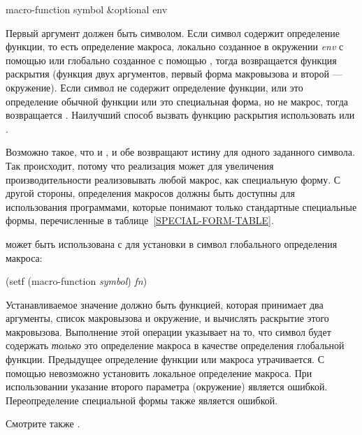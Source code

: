 \begin{defun}[Function]
macro-function symbol &optional env

Первый аргумент должен быть символом. Если символ содержит определение функции,
то есть определение макроса, локально созданное в окружении \emph{env} с помощью
 или глобально созданное с помощью , тогда
возвращается функция раскрытия (функция двух аргументов, первый форма
макровызова и второй --- окружение).
Если символ не содержит определение функции, или это определение обычной функции
или это специальная форма, но не макрос, тогда возвращается {\false}. 
Наилучший способ вызвать функцию раскрытия использовать
 или .

Возможно такое, что и , и  обе возвращают
истину для одного заданного символа. Так происходит, потому что реализация может
для увеличения производительности реализовывать любой макрос, как специальную
форму.
С другой стороны, определения макросов должны быть доступны для использования
программами, которые понимают только стандартные специальные формы,
перечисленные в таблице~\ref{SPECIAL-FORM-TABLE}.

 может быть использована с  для установки в символ
глобального определения макроса:
\begin{lisp}
(setf (macro-function \emph{symbol}) \emph{fn})
\end{lisp}
Устанавливаемое значение должно быть функцией, которая принимает два аргументы,
список макровызова и окружение, и вычислять раскрытие этого макровызова. 
Выполнение этой операции указывает на то, что символ будет содержать \emph{только} это
определение макроса в качестве определения глобальной функции. Предыдущее
определение функции или макроса утрачивается. С помощью  невозможно
установить локальное определение макроса. При использовании  указание
второго параметра (окружение) является ошибкой.
Переопределение специальной формы также является ошибкой.

Смотрите также .
\end{defun}

